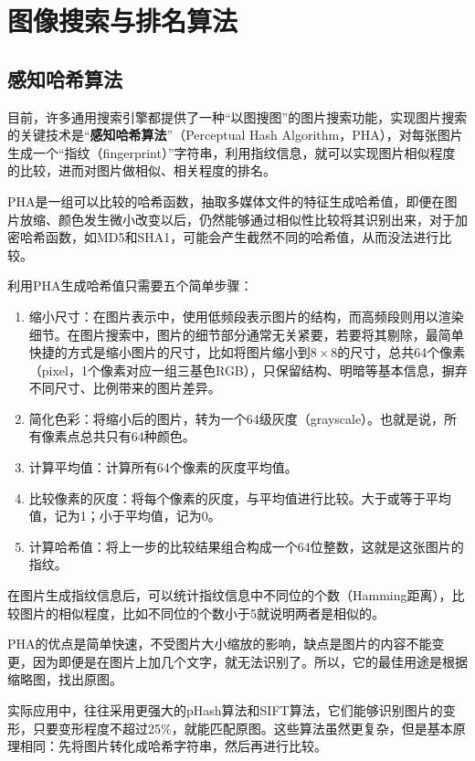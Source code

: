 \chapter{图像搜索与排名算法}
\section{感知哈希算法}
目前，许多通用搜索引擎都提供了一种“以图搜图”的图片搜索功能，实现图片搜索的关键技术是“\textbf{感知哈希算法}”（Perceptual Hash Algorithm，PHA），对每张图片生成一个“指纹（fingerprint）”字符串，利用指纹信息，就可以实现图片相似程度的比较，进而对图片做相似、相关程度的排名。

PHA是一组可以比较的哈希函数，抽取多媒体文件的特征生成哈希值，即便在图片放缩、颜色发生微小改变以后，仍然能够通过相似性比较将其识别出来，对于加密哈希函数，如MD5和SHA1，可能会产生截然不同的哈希值，从而没法进行比较。

利用PHA生成哈希值只需要五个简单步骤：
\begin{enumerate}[（1）]
  \item 缩小尺寸：在图片表示中，使用低频段表示图片的结构，而高频段则用以渲染细节。在图片搜索中，图片的细节部分通常无关紧要，若要将其剔除，最简单快捷的方式是缩小图片的尺寸，比如将图片缩小到$8\times 8$的尺寸，总共64个像素（pixel，1个像素对应一组三基色RGB），只保留结构、明暗等基本信息，摒弃不同尺寸、比例带来的图片差异。
  \item 简化色彩：将缩小后的图片，转为一个64级灰度（grayscale）。也就是说，所有像素点总共只有64种颜色。
  \item 计算平均值：计算所有64个像素的灰度平均值。
  \item 比较像素的灰度：将每个像素的灰度，与平均值进行比较。大于或等于平均值，记为1；小于平均值，记为0。
  \item 计算哈希值：将上一步的比较结果组合构成一个64位整数，这就是这张图片的指纹。
\end{enumerate}

在图片生成指纹信息后，可以统计指纹信息中不同位的个数（Hamming距离），比较图片的相似程度，比如不同位的个数小于5就说明两者是相似的。

PHA的优点是简单快速，不受图片大小缩放的影响，缺点是图片的内容不能变更，因为即便是在图片上加几个文字，就无法识别了。所以，它的最佳用途是根据缩略图，找出原图。

实际应用中，往往采用更强大的pHash算法和SIFT算法，它们能够识别图片的变形，只要变形程度不超过25\%，就能匹配原图。这些算法虽然更复杂，但是基本原理相同：先将图片转化成哈希字符串，然后再进行比较。

